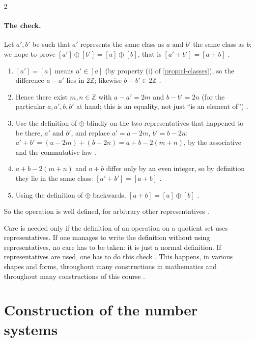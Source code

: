 \begin{paracol}{2}
\paragraph{The check.} Let $a',b'$ be such that $a'$ represents the same class as $a$ and $b'$ the same class as $b$; we
hope to prove $[a']\oplus[b']=[a]\oplus[b]$, that is $[a'+b']=[a+b]$ .
\begin{enumerate}
  \item $[a']=[a]$ means $a'\in[a]$ (by property (i) of \cref{prop:cl-classes}), so the difference $a-a'$ lies in
        $2\mathbb Z$; likewise $b-b'\in2\mathbb Z$ .
  \item Hence there exist $m,n\in\mathbb Z$ with $a-a'=2m$ and $b-b'=2n$ (for the particular $a,a',b,b'$ at hand; this is
        an equality, not just ``is an element of'') .
  \item Use the definition of $\oplus$ blindly on the two representatives that happened to be there, $a'$ and $b'$, and
        replace $a'=a-2m$, $b'=b-2n$:
        $a'+b'=(a-2m)+(b-2n)=a+b-2(m+n)$, by the associative and the commutative law
        .
  \item $a+b-2(m+n)$ and $a+b$ differ only by an even integer, so by definition they lie in the same class:
        $[a'+b']=[a+b]$ .
  \item Using the definition of $\oplus$ backwards, $[a+b]=[a]\oplus[b]$ .
\end{enumerate}
So the operation is well defined, for arbitrary other representatives .

\begin{remark}\label{rem:cl-wd}
Care is needed only if the definition of an operation on a quotient set uses representatives. If one manages to write the
definition without using representatives, no care has to be taken: it is just a normal definition. If representatives are
used, one has to do this check . This happens, in various shapes and forms, throughout many constructions in
mathematics and throughout many constructions of this course .
\end{remark}

\section{Construction of the number systems}\label{sec:cl-numbers}


\end{paracol}
